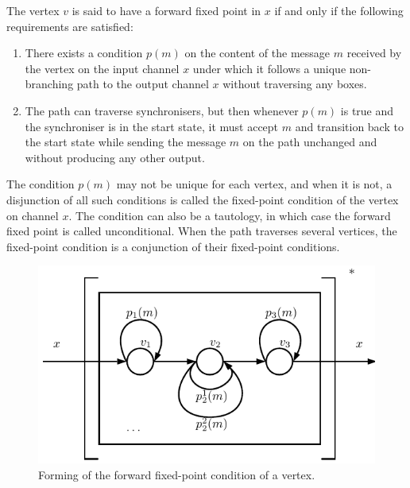\begin{definition}The vertex $v$ is said to have a forward fixed point in $x$ if and only if the following requirements are satisfied:

\begin{enumerate}
\item There exists a condition $p(m)$ on the content of the message $m$ received by the vertex on the input channel $x$ under which it follows a unique non-branching path to the output channel $x$ without traversing any boxes.

\item The path can traverse synchronisers, but then whenever $p(m)$ is true and the synchroniser is in the start state, it must accept $m$ and transition back to the start state while sending the message $m$ on the path unchanged and without producing any other output.

\end{enumerate}
\end{definition}

The condition $p(m)$ may not be unique for each vertex, and when it is not, a disjunction of all such conditions is called the fixed-point condition of the vertex on channel $x$. The condition can also be a tautology, in which case the forward fixed point is called unconditional. When the path traverses several vertices, the fixed-point condition is a conjunction of their fixed-point conditions.

  \begin{figure}[h!]
  \centering
  \includegraphics{figs/chapter_04_ffp.pdf}
  \caption{Forming of the forward fixed-point condition of a vertex.}
  \label{fig:ffp}
  \end{figure}

